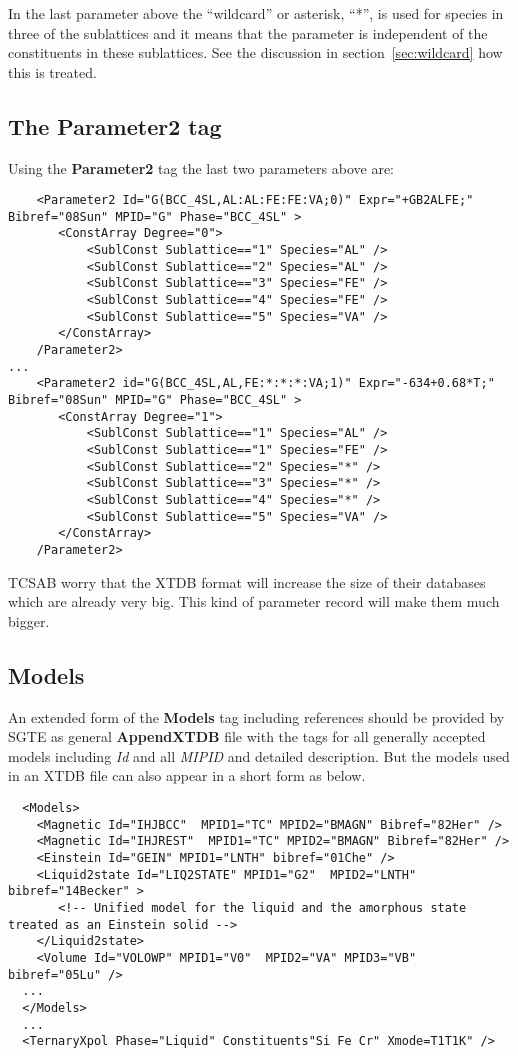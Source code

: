 \documentclass{article}
\begin{document}
\begin{appendices}
In the last parameter above the ``wildcard'' or asterisk, ``*'', is
used for species in three of the sublattices and it means that the
parameter is independent of the constituents in these sublattices.
See the discussion in section~\ref{sec:wildcard} how this is treated.


\subsection{The Parameter2 tag}

Using the {\bf Parameter2} tag the last two parameters above are:

{\small
\begin{verbatim}
    <Parameter2 Id="G(BCC_4SL,AL:AL:FE:FE:VA;0)" Expr="+GB2ALFE;" Bibref="08Sun" MPID="G" Phase="BCC_4SL" >
       <ConstArray Degree="0">
           <SublConst Sublattice=="1" Species="AL" />
           <SublConst Sublattice=="2" Species="AL" />
           <SublConst Sublattice=="3" Species="FE" />
           <SublConst Sublattice=="4" Species="FE" />
           <SublConst Sublattice=="5" Species="VA" />
       </ConstArray>
    /Parameter2>
...
    <Parameter2 id="G(BCC_4SL,AL,FE:*:*:*:VA;1)" Expr="-634+0.68*T;" Bibref="08Sun" MPID="G" Phase="BCC_4SL" >
       <ConstArray Degree="1">
           <SublConst Sublattice=="1" Species="AL" />
           <SublConst Sublattice=="1" Species="FE" />
           <SublConst Sublattice=="2" Species="*" />
           <SublConst Sublattice=="3" Species="*" />
           <SublConst Sublattice=="4" Species="*" />
           <SublConst Sublattice=="5" Species="VA" />
       </ConstArray>
    /Parameter2>
\end{verbatim}
}

TCSAB worry that the XTDB format will increase the size of their
databases which are already very big.  This kind of parameter record
will make them much bigger.

\subsection{Models}\label{sec:modelex}

An extended form of the {\bf Models} tag including references should
be provided by SGTE as general {\bf AppendXTDB} file with the tags
for all generally accepted models including {\em Id} and all {\em
  MIPID} and detailed description.  But the models used in an XTDB
file can also appear in a short form as below.

{\small
\begin{verbatim}
  <Models>
    <Magnetic Id="IHJBCC"  MPID1="TC" MPID2="BMAGN" Bibref="82Her" />
    <Magnetic Id="IHJREST"  MPID1="TC" MPID2="BMAGN" Bibref="82Her" />
    <Einstein Id="GEIN" MPID1="LNTH" bibref="01Che" /> 
    <Liquid2state Id="LIQ2STATE" MPID1="G2"  MPID2="LNTH" bibref="14Becker" >
       <!-- Unified model for the liquid and the amorphous state treated as an Einstein solid -->
    </Liquid2state>
    <Volume Id="VOLOWP" MPID1="V0"  MPID2="VA" MPID3="VB" bibref="05Lu" />
  ...
  </Models>
  ...
  <TernaryXpol Phase="Liquid" Constituents"Si Fe Cr" Xmode=T1T1K" />
\end{verbatim}
}


\end{appendices}
\end{document}
